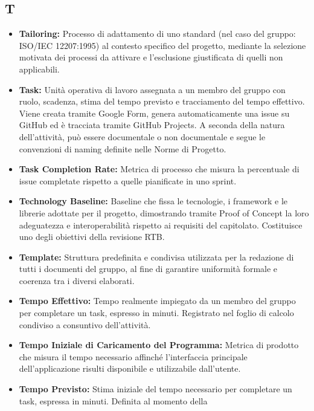 \subsection*{T}
\begin{itemize}[leftmargin=*]
      \item \textbf{Tailoring:} Processo di adattamento di uno standard (nel caso del
            gruppo: ISO/IEC 12207:1995) al contesto specifico del progetto, mediante
            la selezione motivata dei processi da attivare e l'esclusione giustificata
            di quelli non applicabili.
      \item \textbf{Task:} Unità operativa di lavoro assegnata a un membro del gruppo
      con ruolo, scadenza, stima del tempo previsto e tracciamento del tempo effettivo.
      Viene creata tramite Google Form, genera automaticamente una issue su GitHub ed
      è tracciata tramite GitHub Projects. A seconda della natura dell'attività, può
      essere documentale o non documentale e segue le convenzioni di naming definite
      nelle Norme di Progetto.
      \item \textbf{Task Completion Rate:} Metrica di processo che misura la percentuale
      di issue completate rispetto a quelle pianificate in uno sprint.
      \item \textbf{Technology Baseline:} Baseline che fissa le tecnologie, i
            framework e le librerie adottate per il progetto, dimostrando tramite
            Proof of Concept la loro adeguatezza e interoperabilità rispetto ai
            requisiti del capitolato. Costituisce uno degli obiettivi della
            revisione RTB.
      \item \textbf{Template:} Struttura predefinita e condivisa utilizzata per la
            redazione di tutti i documenti del gruppo, al fine di garantire uniformità
            formale e coerenza tra i diversi elaborati.
      \item \textbf{Tempo Effettivo:} Tempo realmente impiegato da un membro del
            gruppo per completare un task, espresso in minuti. Registrato nel foglio
            di calcolo condiviso a consuntivo dell'attività.
      \item \textbf{Tempo Iniziale di Caricamento del Programma:} Metrica di prodotto
      che misura il tempo necessario affinché l'interfaccia principale dell'applicazione
      risulti disponibile e utilizzabile dall'utente.
            \item \textbf{Tempo Previsto:} Stima iniziale del tempo necessario per
            completare un task, espressa in minuti. Definita al momento della

\end{itemize}
